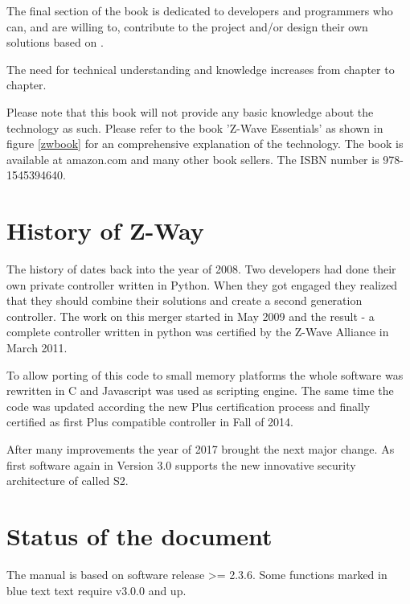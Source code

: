 The final section of the book is dedicated to developers and programmers who can, and are 
willing to, contribute to the project and/or design their own solutions based on \zway.

The need for technical understanding and knowledge increases from chapter to chapter.

Please note that this book will not provide any basic knowledge about the \zwave technology
as such. Please
refer to the book 'Z-Wave Essentials' as shown in figure \ref{zwbook} for an comprehensive
explanation of the \zwave technology. The book is available at amazon.com and many other 
book sellers. The ISBN number is 978-1545394640.


\section{History of Z-Way}

The history of \zway dates back into the year of 2008. Two developers had done their own
private \zwave controller written in Python. When they got engaged they realized that
they should combine their solutions and create a second generation \zwave controller.
The work on this merger started in May 2009 and the result - a complete \zwave controller 
written in python was certified by the Z-Wave Alliance in March 2011.


To allow porting of this code to small memory platforms the whole software was rewritten
in C and Javascript was used as scripting engine. The same time the code was updated according 
the new \zwave Plus certification process and finally certified as first \zwave Plus 
compatible controller in Fall of 2014.
 
 
After many improvements the year of 2017 brought the next major change. As first software 
again \zway in Version 3.0 supports the new innovative security architecture of \zwave 
called S2.

\section{Status of the document}

The manual is based on \zway software release >= 2.3.6. Some functions marked in blue text
text require \zway v3.0.0 and up.
